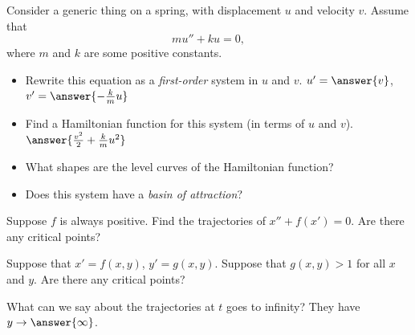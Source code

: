 \documentclass{ximera}
\begin{document}
\begin{exercise} 
    Consider a generic thing on a spring, with displacement $u$ and velocity $v$. Assume that $$mu''+ku=0,$$ where $m$ and $k$ are some positive constants.
    \begin{itemize}
        \item Rewrite this equation as a {\it first-order} system in $u$ and $v$. $u' = \answer{v}$, $v'= \answer{-\frac{k}{m}u}$
        \item Find a Hamiltonian function for this system (in terms of $u$ and $v$). $\answer{\frac{v^2}{2} + \frac{k}{m}u^2}$
        \item What shapes are the level curves of the Hamiltonian function? 
        \item Does this system have a {\it basin of attraction}? %
    \end{itemize}
\end{exercise}

\begin{exercise}
    Suppose $f$ is always positive. Find the trajectories of $x''+f(x') = 0$. Are there any critical points?\\
\end{exercise}

\begin{exercise}
    Suppose that $x' = f(x,y)$, $y' = g(x,y)$.  Suppose that $g(x,y) > 1$ for all $x$ and $y$.  Are there any critical points?  
    \begin{multipleChoice}
    \end{multipleChoice}
    \begin{problem}
        What can we say about the trajectories at $t$ goes to infinity? They have $y \rightarrow \answer{\infty}$.
    \end{problem}
\end{exercise}
\end{document}

